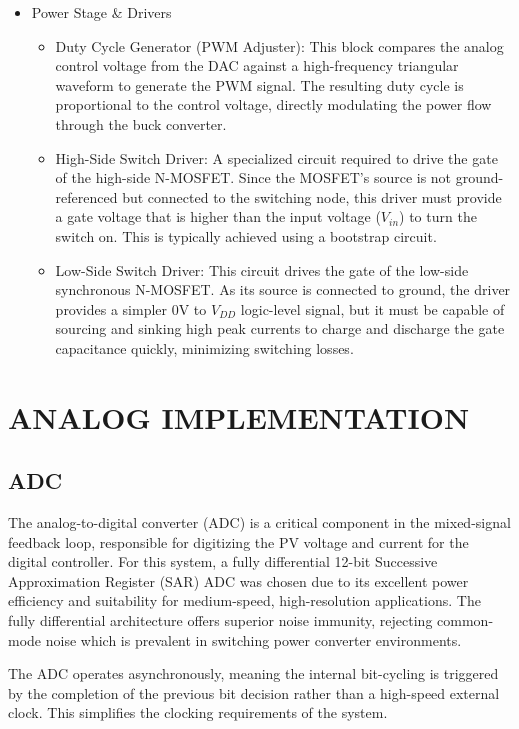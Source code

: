 \documentclass[a4paper,oneside,12pt]{report}
\numberwithin{equation}{chapter}
\begin{document}
\begin{itemize}
    \item Power Stage \& Drivers
    \begin{itemize}
        \item Duty Cycle Generator (PWM Adjuster): This block compares the analog control voltage from the DAC against a high-frequency triangular waveform to generate the PWM signal. The resulting duty cycle is proportional to the control voltage, directly modulating the power flow through the buck converter.
        \item High-Side Switch Driver: A specialized circuit required to drive the gate of the high-side N-MOSFET. Since the MOSFET's source is not ground-referenced but connected to the switching node, this driver must provide a gate voltage that is higher than the input voltage ($V_{in}$) to turn the switch on. This is typically achieved using a bootstrap circuit.
        \item Low-Side Switch Driver: This circuit drives the gate of the low-side synchronous N-MOSFET. As its source is connected to ground, the driver provides a simpler 0V to $V_{DD}$ logic-level signal, but it must be capable of sourcing and sinking high peak currents to charge and discharge the gate capacitance quickly, minimizing switching losses.
    \end{itemize}
\end{itemize}

\chapter{ANALOG IMPLEMENTATION}\label{chapter:analog_impl}

\section{ADC}
The analog-to-digital converter (ADC) is a critical component in the mixed-signal feedback loop, responsible for digitizing the PV voltage and current for the digital controller. For this system, a fully differential 12-bit Successive Approximation Register (SAR) ADC was chosen due to its excellent power efficiency and suitability for medium-speed, high-resolution applications. The fully differential architecture offers superior noise immunity, rejecting common-mode noise which is prevalent in switching power converter environments.

The ADC operates asynchronously, meaning the internal bit-cycling is triggered by the completion of the previous bit decision rather than a high-speed external clock. This simplifies the clocking requirements of the system.
\end{document}
